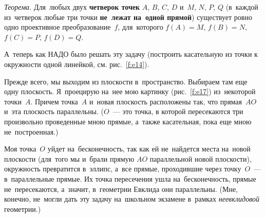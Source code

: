 \textit{Теорема.} Для~любых двух \textbf{четверок точек} $A$, $B$, $C$, $D$ и~$M$, $N$, $P$, $Q$ (в~каждой из~четверок любые
три точки \textbf{не~лежат на~одной прямой}) существует ровно одно проективное преобразование~$f$,
для~которого $f(A)=M$, $f(B)=N$, $f(C)=P$, $f(D)=Q$.

\smallskip

\hrulefill

\medskip

А~теперь как НАДО было решать эту задачу (построить касательную из точки
к окружности одной линейкой, см. рис.~\ref{f:e14}).

Прежде всего, мы выходим из плоскости в~пространство. Выбираем там еще одну плоскость.
Я~проецирую на~нее мою картинку (рис.~\ref{f:e17}) из~некоторой точки~$A$.
Причем точка~$A$ и~новая плоскость расположены так, что прямая~$AO$ и~эта
плоскость параллельны. ($O$~--- это точка, в которой пересекаются три произвольно
проведенные мною прямые,
 а~также касательная, пока еще мною не~построенная.)


Моя точка~$O$ уйдет на~бесконечность, так как ей не~найдется места на~новой плоскости
(для~того мы и~брали прямую $AO$ параллельной новой плоскости), окружность превратится в~эллипс, а~все прямые,
проходившие через точку~$O$~--- в~параллельные прямые. Их точка пересечения ушла на~бесконечность,
прямые не~пересекаются, а~значит, в~геометрии Евклида они параллельны. (Мне, конечно, не~могли
дать эту задачу на~школьном экзамене в~рамках \textit{неевклидовой} геометрии.)


